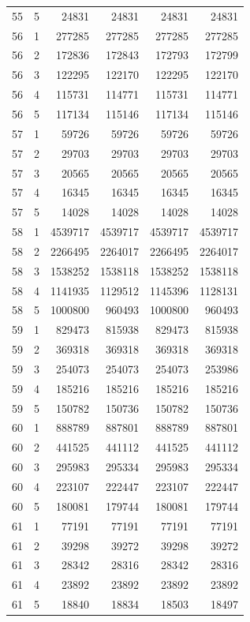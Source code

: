 \begin{longtable}{rrrrrr}
55 & 5 & 24831 & 24831 & 24831 & 24831 \\
56 & 1 & 277285 & 277285 & 277285 & 277285 \\
56 & 2 & 172836 & 172843 & 172793 & 172799 \\
56 & 3 & 122295 & 122170 & 122295 & 122170 \\
56 & 4 & 115731 & 114771 & 115731 & 114771 \\
56 & 5 & 117134 & 115146 & 117134 & 115146 \\
57 & 1 & 59726 & 59726 & 59726 & 59726 \\
57 & 2 & 29703 & 29703 & 29703 & 29703 \\
57 & 3 & 20565 & 20565 & 20565 & 20565 \\
57 & 4 & 16345 & 16345 & 16345 & 16345 \\
57 & 5 & 14028 & 14028 & 14028 & 14028 \\
58 & 1 & 4539717 & 4539717 & 4539717 & 4539717 \\
58 & 2 & 2266495 & 2264017 & 2266495 & 2264017 \\
58 & 3 & 1538252 & 1538118 & 1538252 & 1538118 \\
58 & 4 & 1141935 & 1129512 & 1145396 & 1128131 \\
58 & 5 & 1000800 & 960493 & 1000800 & 960493 \\
59 & 1 & 829473 & 815938 & 829473 & 815938 \\
59 & 2 & 369318 & 369318 & 369318 & 369318 \\
59 & 3 & 254073 & 254073 & 254073 & 253986 \\
59 & 4 & 185216 & 185216 & 185216 & 185216 \\
59 & 5 & 150782 & 150736 & 150782 & 150736 \\
60 & 1 & 888789 & 887801 & 888789 & 887801 \\
60 & 2 & 441525 & 441112 & 441525 & 441112 \\
60 & 3 & 295983 & 295334 & 295983 & 295334 \\
60 & 4 & 223107 & 222447 & 223107 & 222447 \\
60 & 5 & 180081 & 179744 & 180081 & 179744 \\
61 & 1 & 77191 & 77191 & 77191 & 77191 \\
61 & 2 & 39298 & 39272 & 39298 & 39272 \\
61 & 3 & 28342 & 28316 & 28342 & 28316 \\
61 & 4 & 23892 & 23892 & 23892 & 23892 \\
61 & 5 & 18840 & 18834 & 18503 & 18497 \\

\end{longtable}
